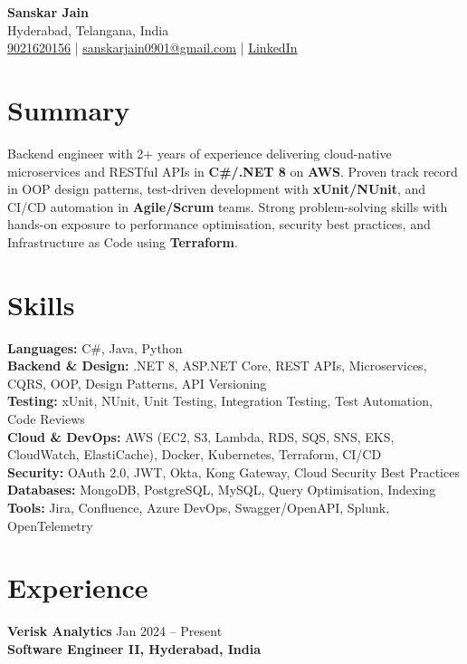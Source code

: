 \documentclass[a4paper,10pt]{article}
\begin{document}
\begin{center}
    {\LARGE \textbf{Sanskar Jain}} \\
    Hyderabad, Telangana, India \\
    \href{tel:9021620156}{9021620156} \;|\;
    \href{mailto:sanskarjain0901@gmail.com}{sanskarjain0901@gmail.com} \;|\;
    \href{https://www.linkedin.com/in/sanskar-jain0901/}{LinkedIn}
\end{center}

\vspace{3pt}

\section*{Summary}
Backend engineer with 2+ years of experience delivering cloud-native microservices and RESTful APIs in \textbf{C\#/.NET 8} on \textbf{AWS}.
Proven track record in OOP design patterns, test-driven development with \textbf{xUnit/NUnit}, and CI/CD automation in \textbf{Agile/Scrum} teams.
Strong problem-solving skills with hands-on exposure to performance optimisation, security best practices, and Infrastructure as Code using \textbf{Terraform}.

\section*{Skills}
\textbf{Languages:} C\#, Java, Python \\
\textbf{Backend \& Design:} .NET 8, ASP.NET Core, REST APIs, Microservices, CQRS, OOP, Design Patterns, API Versioning \\
\textbf{Testing:} xUnit, NUnit, Unit Testing, Integration Testing, Test Automation, Code Reviews \\
\textbf{Cloud \& DevOps:} AWS (EC2, S3, Lambda, RDS, SQS, SNS, EKS, CloudWatch, ElastiCache), Docker, Kubernetes, Terraform, CI/CD \\
\textbf{Security:} OAuth 2.0, JWT, Okta, Kong Gateway, Cloud Security Best Practices \\
\textbf{Databases:} MongoDB, PostgreSQL, MySQL, Query Optimisation, Indexing \\
\textbf{Tools:} Jira, Confluence, Azure DevOps, Swagger/OpenAPI, Splunk, OpenTelemetry

\section*{Experience}

\textbf{Verisk Analytics} \hfill Jan 2024 -- Present \\
\textbf{Software Engineer II, Hyderabad, India}
\end{document}
